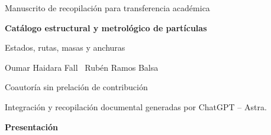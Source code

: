 \documentclass[a4paper,10pt]{article}
\begin{document}
\thispagestyle{plain}
\begin{center}
{\fontsize{10}{12}\selectfont Manuscrito de recopilación para transferencia académica\par}
\vspace{12mm}
{\fontsize{17}{20.5}\selectfont\bfseries Catálogo estructural y metrológico de partículas\par}
\vspace{6pt}
{\fontsize{11}{13.5}\selectfont Estados, rutas, masas y anchuras\par}
\vspace{11pt}
{\fontsize{11.5}{14}\selectfont Oumar Haidara Fall \textperiodcentered\ Rubén Ramos Balsa\par}
\vspace{4pt}
{\fontsize{8}{10}\selectfont Coautoría sin prelación de contribución\par}
\vspace{3pt}
{\fontsize{7.5}{9.5}\selectfont Integración y recopilación documental generadas por ChatGPT -- Astra.\par}
\end{center}
\vspace{7pt}
\begin{center}\bfseries Presentación\end{center}
\begingroup
\fontsize{10.5}{12.8}\selectfont
\setlength{\parskip}{2pt plus 1pt minus .5pt}
\noindent
\end{document}
